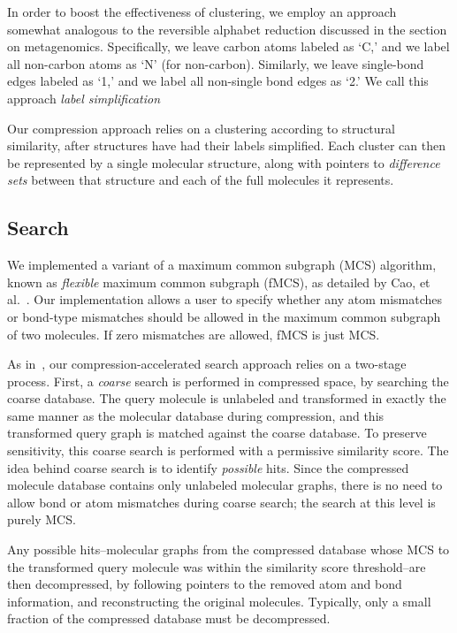 \documentclass{amsbook}
\theoremstyle{definition}
\theoremstyle{remark}
\numberwithin{equation}{section}
\begin{document}
In order to boost the effectiveness of clustering, we employ an approach
somewhat analogous to the reversible alphabet reduction discussed in the section
on metagenomics.
Specifically, we leave carbon atoms labeled as `C,' and we label all non-carbon
atoms as `N' (for non-carbon).
Similarly, we leave single-bond edges labeled as `1,' and we label all 
non-single bond edges as `2.'
We call this approach \emph{label simplification}

Our compression approach relies on a clustering according to structural 
similarity, after structures have had their labels simplified.
Each cluster can then be represented by a single molecular structure, along 
with pointers to \emph{difference sets} between that structure and each of the 
full molecules it represents.



\subsection*{Search}

We implemented a variant of a maximum common subgraph (MCS) algorithm, known as \emph{flexible} maximum
common subgraph (fMCS), as detailed by Cao, et al.~\cite{cao}.
Our implementation allows a user to specify whether any atom mismatches or bond-type mismatches should be 
allowed in the maximum common subgraph of two molecules.
If zero mismatches are allowed, fMCS is just MCS.

As in~\cite{loh2012compressive}, our compression-accelerated search approach relies on a two-stage process.
First, a \emph{coarse} search is performed in compressed space, by searching the coarse database.
The query molecule is unlabeled and transformed in exactly the same manner as the molecular database
during compression, and this transformed query graph is matched against the coarse database.
To preserve sensitivity, this coarse search is performed with a permissive similarity score.
The idea behind coarse search is to identify \emph{possible} hits.
Since the compressed molecule database contains only unlabeled molecular graphs, there is no need to
allow bond or atom mismatches during coarse search; the search at this level is purely MCS.

Any possible hits--molecular graphs from the compressed database whose MCS to the transformed
query molecule was within the similarity score threshold--are then decompressed, by following
pointers to the removed atom and bond information, and reconstructing the original molecules.
Typically, only a small fraction of the compressed database must be decompressed.
\end{document}
